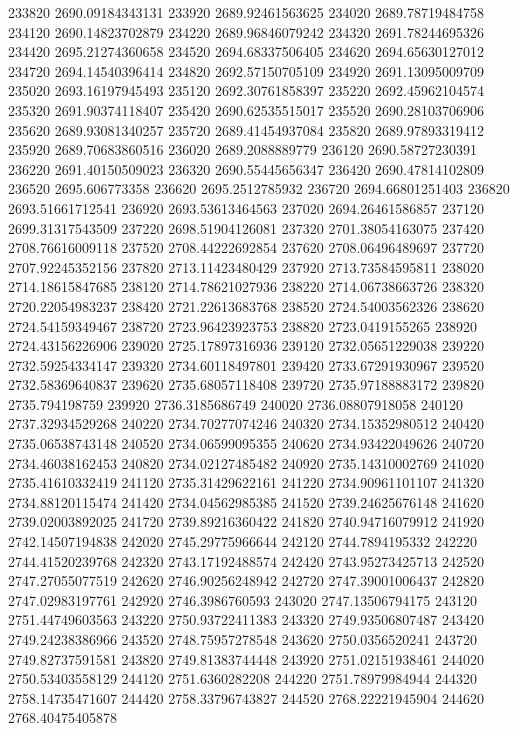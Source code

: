 {233820 2690.09184343131
233920 2689.92461563625
234020 2689.78719484758
234120 2690.14823702879
234220 2689.96846079242
234320 2691.78244695326
234420 2695.21274360658
234520 2694.68337506405
234620 2694.65630127012
234720 2694.14540396414
234820 2692.57150705109
234920 2691.13095009709
235020 2693.16197945493
235120 2692.30761858397
235220 2692.45962104574
235320 2691.90374118407
235420 2690.62535515017
235520 2690.28103706906
235620 2689.93081340257
235720 2689.41454937084
235820 2689.97893319412
235920 2689.70683860516
236020 2689.2088889779
236120 2690.58727230391
236220 2691.40150509023
236320 2690.55445656347
236420 2690.47814102809
236520 2695.606773358
236620 2695.2512785932
236720 2694.66801251403
236820 2693.51661712541
236920 2693.53613464563
237020 2694.26461586857
237120 2699.31317543509
237220 2698.51904126081
237320 2701.38054163075
237420 2708.76616009118
237520 2708.44222692854
237620 2708.06496489697
237720 2707.92245352156
237820 2713.11423480429
237920 2713.73584595811
238020 2714.18615847685
238120 2714.78621027936
238220 2714.06738663726
238320 2720.22054983237
238420 2721.22613683768
238520 2724.54003562326
238620 2724.54159349467
238720 2723.96423923753
238820 2723.0419155265
238920 2724.43156226906
239020 2725.17897316936
239120 2732.05651229038
239220 2732.59254334147
239320 2734.60118497801
239420 2733.67291930967
239520 2732.58369640837
239620 2735.68057118408
239720 2735.97188883172
239820 2735.794198759
239920 2736.3185686749
240020 2736.08807918058
240120 2737.32934529268
240220 2734.70277074246
240320 2734.15352980512
240420 2735.06538743148
240520 2734.06599095355
240620 2734.93422049626
240720 2734.46038162453
240820 2734.02127485482
240920 2735.14310002769
241020 2735.41610332419
241120 2735.31429622161
241220 2734.90961101107
241320 2734.88120115474
241420 2734.04562985385
241520 2739.24625676148
241620 2739.02003892025
241720 2739.89216360422
241820 2740.94716079912
241920 2742.14507194838
242020 2745.29775966644
242120 2744.7894195332
242220 2744.41520239768
242320 2743.17192488574
242420 2743.95273425713
242520 2747.27055077519
242620 2746.90256248942
242720 2747.39001006437
242820 2747.02983197761
242920 2746.3986760593
243020 2747.13506794175
243120 2751.44749603563
243220 2750.93722411383
243320 2749.93506807487
243420 2749.24238386966
243520 2748.75957278548
243620 2750.0356520241
243720 2749.82737591581
243820 2749.81383744448
243920 2751.02151938461
244020 2750.53403558129
244120 2751.6360282208
244220 2751.78979984944
244320 2758.14735471607
244420 2758.33796743827
244520 2768.22221945904
244620 2768.40475405878
}
